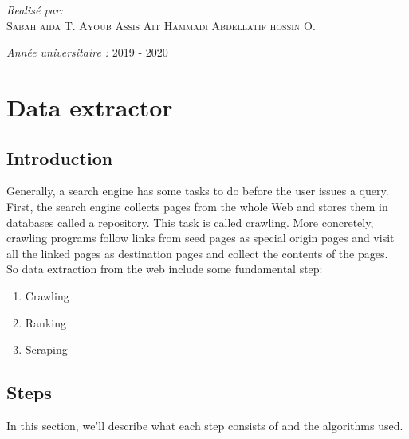 \documentclass{article}
\begin{document}
\begin{titlepage}
\begin{sffamily}
\begin{center}
\begin{minipage}{0.6\textwidth}
\begin{flushleft}
      \end{flushleft}
    \end{minipage}
    \newline \vskip1cm
    \begin{minipage}{0.5\textwidth}
      \begin{center} \large
        \emph{Realisé par:} \\
                            \textsc{Sabah}
                            \textsc{aida T.}
                            \textsc{Ayoub Assis}
                            \textsc{Ait Hammadi Abdellatif}
                            \textsc{hossin O.}
      \end{center}
    \end{minipage}
    \vskip2cm
    \vfill

    {\large \emph{Année universitaire : } 2019 - 2020}

  \end{center}
  \end{sffamily}
\end{titlepage}

\clearpage


\vfill
\newpage
\tableofcontents
\newpage

\chapter{Data extractor}
\section{Introduction}
Generally, a search engine has some tasks to do before the user issues
a query. First, the search engine collects pages from the whole Web and
stores them in databases called a repository. This task is called crawling. More concretely, crawling programs follow links from seed pages as special origin pages and visit all the linked pages as destination pages and collect the contents of the pages.\\
So data extraction from the web include some fundamental step:
\begin{enumerate}
    \item Crawling
    \item Ranking
    \item Scraping
\end{enumerate}
\section{Steps}
In this section, we'll describe what each step consists of and  the algorithms used.
\end{document}
